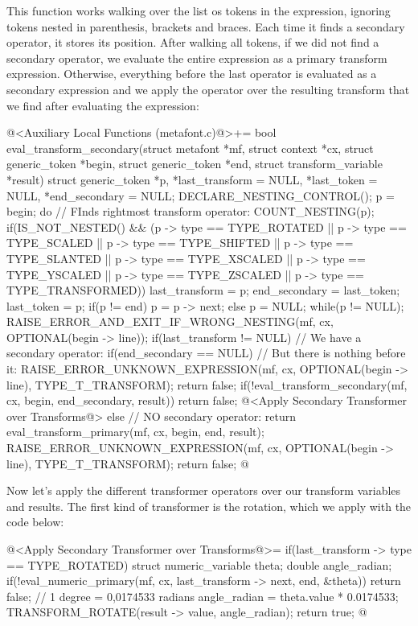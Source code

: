 This function works walking over the list os tokens in the expression,
ignoring tokens nested in parenthesis, brackets and braces. Each time
it finds a secondary operator, it stores its position. After walking
all tokens, if we did not find a secondary operator, we evaluate the
entire expression as a primary transform expression. Otherwise,
everything before the last operator is evaluated as a secondary
expression and we apply the operator over the resulting transform that
we find after evaluating the expression:

\iniciocodigo
@<Auxiliary Local Functions (metafont.c)@>+=
bool eval_transform_secondary(struct metafont *mf, struct context *cx,
                              struct generic_token *begin,
                              struct generic_token *end,
                              struct transform_variable *result){
  struct generic_token *p, *last_transform = NULL, *last_token = NULL,
                       *end_secondary = NULL;
  DECLARE_NESTING_CONTROL();
  p = begin;
  do{ // FInds rightmost transform operator:
    COUNT_NESTING(p);
    if(IS_NOT_NESTED() &&
       (p -> type == TYPE_ROTATED || p -> type == TYPE_SCALED ||
        p -> type == TYPE_SHIFTED || p -> type == TYPE_SLANTED ||
        p -> type == TYPE_XSCALED || p -> type == TYPE_YSCALED ||
        p -> type == TYPE_ZSCALED || p -> type == TYPE_TRANSFORMED)){
      last_transform = p;
      end_secondary = last_token;
    }
    last_token = p;
    if(p != end)
      p = p -> next;
    else
      p = NULL;
  } while(p != NULL);
  RAISE_ERROR_AND_EXIT_IF_WRONG_NESTING(mf, cx, OPTIONAL(begin -> line));
  if(last_transform != NULL){ // We have a secondary operator:
    if(end_secondary == NULL){ // But there is nothing before it:
      RAISE_ERROR_UNKNOWN_EXPRESSION(mf, cx, OPTIONAL(begin -> line),
                                     TYPE_T_TRANSFORM);
      return false;
    }
    if(!eval_transform_secondary(mf, cx, begin, end_secondary, result))
      return false;
    @<Apply Secondary Transformer over Transforms@>
  }
  else // NO secondary operator:
    return eval_transform_primary(mf, cx, begin, end, result);
  RAISE_ERROR_UNKNOWN_EXPRESSION(mf, cx, OPTIONAL(begin -> line),
                                 TYPE_T_TRANSFORM);
  return false;
}
@
\fimcodigo

Now let's apply the different transformer operators over our transform
variables and results. The first kind of transformer is the rotation,
which we apply with the code below:

\iniciocodigo
@<Apply Secondary Transformer over Transforms@>=
if(last_transform -> type == TYPE_ROTATED){
  struct numeric_variable theta;
  double angle_radian;
  if(!eval_numeric_primary(mf, cx, last_transform -> next, end, &theta))
    return false;
  // 1 degree = 0,0174533 radians
  angle_radian = theta.value * 0.0174533;
  TRANSFORM_ROTATE(result -> value, angle_radian);
  return true;
}
@
\fimcodigo

